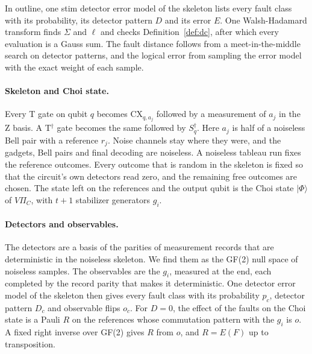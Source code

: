 \documentclass[aps,prl,reprint,twocolumn,amsmath,amssymb,floatfix,nofootinbib,superscriptaddress]{revtex4-2}
\theoremstyle{definition}
\theoremstyle{remark}
\begin{document}
In outline, one stim detector error model of the skeleton lists every fault class with its probability, its detector pattern $D$ and its error $E$. One Walsh-Hadamard transform finds $\Sigma$ and $\ell$ and checks Definition~\ref{def:dc}, after which every evaluation is a Gauss sum. The fault distance follows from a meet-in-the-middle search on detector patterns, and the logical error from sampling the error model with the exact weight of each sample.

\paragraph*{Skeleton and Choi state.}
Every T gate on qubit $q$ becomes $\mathrm{CX}_{q,a_j}$ followed by a measurement of $a_j$ in the Z basis. A T$^\dagger$ gate becomes the same followed by $S^\dagger_q$. Here $a_j$ is half of a noiseless Bell pair with a reference $r_j$. Noise channels stay where they were, and the gadgets, Bell pairs and final decoding are noiseless. A noiseless tableau run fixes the reference outcomes. Every outcome that is random in the skeleton is fixed so that the circuit's own detectors read zero, and the remaining free outcomes are chosen. The state left on the references and the output qubit is the Choi state $|\Phi\rangle$ of $V\Pi_C$, with $t+1$ stabilizer generators $g_i$.

\paragraph*{Detectors and observables.}
The detectors are a basis of the parities of measurement records that are deterministic in the noiseless skeleton. We find them as the GF(2) null space of noiseless samples. The observables are the $g_i$, measured at the end, each completed by the record parity that makes it deterministic. One detector error model of the skeleton then gives every fault class with its probability $p_c$, detector pattern $D_c$ and observable flips $o_c$. For $D=0$, the effect of the faults on the Choi state is a Pauli $R$ on the references whose commutation pattern with the $g_i$ is $o$. A fixed right inverse over GF(2) gives $R$ from $o$, and $R=E(F)$ up to transposition.
\end{document}
